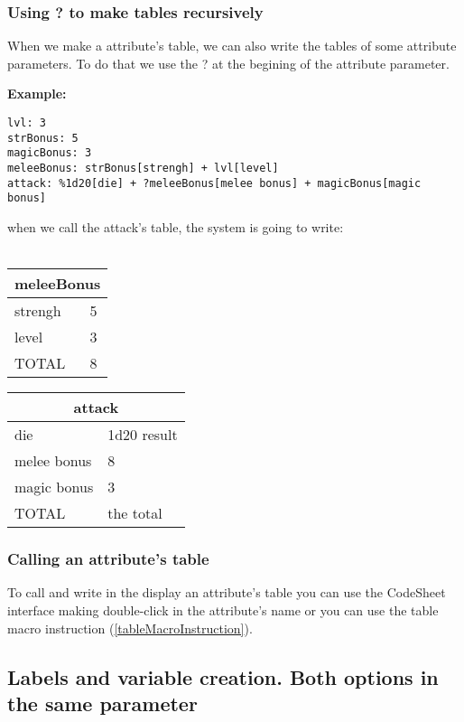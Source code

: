 \documentclass[11pt,a4paper,openright,oneside]{book}
\newenvironment{ex}
{
  \setlength{\parindent}{0cm}
  \large \textbf{Example:} \normalsize 
}
{}
\begin{document}
\subsubsection{Using \textsf{?} to make tables recursively}

When we make a attribute's table, we can also write the tables of some attribute parameters. To do that we use the \textsf{?} at the begining of the attribute parameter.

\begin{ex}
  \begin{lstlisting}
lvl: 3
strBonus: 5
magicBonus: 3
meleeBonus: strBonus[strengh] + lvl[level]
attack: %1d20[die] + ?meleeBonus[melee bonus] + magicBonus[magic bonus]
  \end{lstlisting}
when we call the attack's table, the system is going to write: \\ \\ 
\begin{minipage}[t]{0.4\textwidth}
\scriptsize
\begin{tabular}{|l|l|}
\hline
\multicolumn{2}{|c|}{\textsf{meleeBonus}} \\ \hline
 strengh & 5  \\ \hline
 level & 3 \\ \hline
 TOTAL & 8 \\ \hline
\end{tabular}
\begin{tabular}{|l|l|}
\hline
\multicolumn{2}{|c|}{\textsf{attack}} \\ \hline
 die & 1d20 result  \\ \hline
 melee bonus & 8 \\ \hline
 magic bonus & 3 \\ \hline
 TOTAL & the total \\ \hline
\end{tabular}
\end{minipage}
\end{ex}

\subsubsection{Calling an attribute's table}

To call and write in the display an attribute's table you can use the CodeSheet interface making double-click in the attribute's name or you can use the table macro instruction (\ref{tableMacroInstruction}).

\subsection{Labels and variable creation. Both options in the same parameter}
\end{document}
